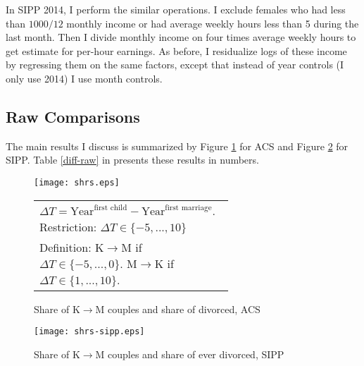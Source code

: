 \documentclass[12pt,letter]{article}
\begin{document}
In SIPP 2014, I perform the similar operations. I exclude females who had less than $1000/12$ monthly income or had average weekly hours less than 5 during the last month. Then I divide monthly income on four times average weekly hours to get estimate for per-hour earnings. As before, I residualize logs of these income by regressing them on the same factors, except that instead of year controls (I only use 2014) I use month controls.

\subsection{Raw Comparisons\label{keycomp}}
The main results I discuss is summarized by Figure \ref{shrs} for ACS and Figure \ref{shrs-sipp} for SIPP. Table \ref{diff-raw} in presents these results in numbers.


\begin{figure}[h!]
\centering
\texttt{[image: shrs.eps]}
\begin{tabular}{|p{0.65\linewidth}|}
\hline
\footnotesize $\Delta T = \text{Year}^{\text{first child}} - \text{Year}^{\text{first marriage}}$. Restriction: $\Delta T \in \{-5,...,10\}$\\
\footnotesize Definition: K$\to$M if $\Delta T \in \{-5,...,0\}$. M$\to$K if $\Delta T \in \{1,...,10\}$.\\\hline
\end{tabular}
\caption{Share of K$\to$M couples and share of divorced, ACS\label{shrs}}
\end{figure}



\begin{figure}[h!]
\centering
\texttt{[image: shrs-sipp.eps]}
\caption{Share of K$\to$M couples and share of ever divorced, SIPP\label{shrs-sipp}}
\end{figure}
\end{document}
